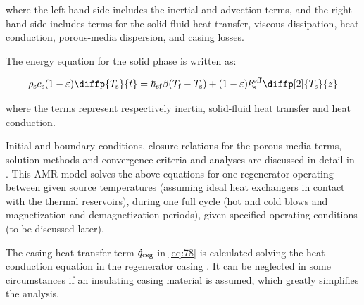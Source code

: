 \documentclass[referee]{svjour3}
\begin{document}
\noindent where the left-hand side includes the inertial and advection terms, and the right-hand side includes terms for the solid-fluid heat transfer, viscous dissipation, heat conduction, porous-media dispersion, and casing losses.





The energy equation for the solid phase is written as:

\begin{equation}
\label{eq:88}
  \rho\ped{s} c\ped{s}(1 - \varepsilon)\diffp{T\ped{s}}{t} = \hheat\ped{sf}\beta(T\ped{f}-T\ped{s}) + (1-\varepsilon)k\ped{s}\ap{eff}\diffp[2]{T\ped{s}}{z}
\end{equation}

\noindent where the terms represent respectively inertia, solid-fluid heat transfer and heat conduction.

Initial and boundary conditions, closure relations for the porous media terms, solution methods and convergence criteria and analyses are discussed in detail in \cite{bib:trevizoli16_perfor_model}. This AMR model solves the above equations for one regenerator operating between given source temperatures (assuming ideal heat exchangers in contact with the thermal reservoirs), during one full cycle (hot and cold blows and  magnetization and demagnetization periods), given specified operating conditions (to be discussed later).

The casing heat transfer term $\dot{q}_{\mathrm{csg}}$ in \autoref{eq:78} is calculated solving the heat conduction equation in the regenerator casing \cite{bib:trevizoli16_perfor_model}. It can be neglected in some circumstances if an insulating casing material is assumed, which greatly simplifies the analysis. 
\end{document}
